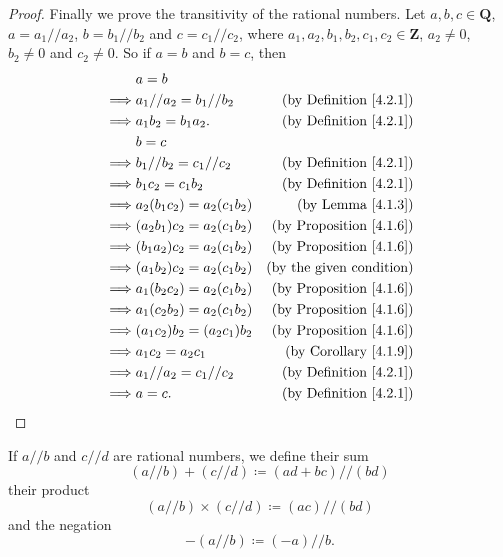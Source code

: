 \begin{proof}
    Finally we prove the transitivity of the rational numbers.
    Let \(a, b, c \in \mathbf{Q}\), \(a = a_1 // a_2\), \(b = b_1 // b_2\) and \(c = c_1 // c_2\), where \(a_1, a_2, b_1, b_2, c_1, c_2 \in \mathbf{Z}\), \(a_2 \neq 0\), \(b_2 \neq 0\) and \(c_2 \neq 0\).
    So if \(a = b\) and \(b = c\), then
    \begin{align*}
                 & a = b                                                           \\
        \implies & a_1 // a_2 = b_1 // b_2   & \text{(by Definition \ref{4.2.1})}  \\
        \implies & a_1b_2 = b_1a_2.          & \text{(by Definition \ref{4.2.1})}  \\
                 & b = c                                                           \\
        \implies & b_1 // b_2 = c_1 // c_2   & \text{(by Definition \ref{4.2.1})}  \\
        \implies & b_1c_2 = c_1b_2           & \text{(by Definition \ref{4.2.1})}  \\
        \implies & a_2(b_1c_2) = a_2(c_1b_2) & \text{(by Lemma \ref{4.1.3})}       \\
        \implies & (a_2b_1)c_2 = a_2(c_1b_2) & \text{(by Proposition \ref{4.1.6})} \\
        \implies & (b_1a_2)c_2 = a_2(c_1b_2) & \text{(by Proposition \ref{4.1.6})} \\
        \implies & (a_1b_2)c_2 = a_2(c_1b_2) & \text{(by the given condition)}     \\
        \implies & a_1(b_2c_2) = a_2(c_1b_2) & \text{(by Proposition \ref{4.1.6})} \\
        \implies & a_1(c_2b_2) = a_2(c_1b_2) & \text{(by Proposition \ref{4.1.6})} \\
        \implies & (a_1c_2)b_2 = (a_2c_1)b_2 & \text{(by Proposition \ref{4.1.6})} \\
        \implies & a_1c_2 = a_2c_1           & \text{(by Corollary \ref{4.1.9})}   \\
        \implies & a_1 // a_2 = c_1 // c_2   & \text{(by Definition \ref{4.2.1})}  \\
        \implies & a = c.                    & \text{(by Definition \ref{4.2.1})}
    \end{align*}
\end{proof}

\begin{definition}\label{4.2.2}
    If \(a // b\) and \(c // d\) are rational numbers, we define their sum
    \[
        (a // b) + (c // d) \coloneqq (ad + bc) // (bd)
    \]
    their product
    \[
        (a // b) \times (c // d) \coloneqq (ac) // (bd)
    \]
    and the negation
    \[
        -(a // b) \coloneqq (-a) // b.
    \]
\end{definition}

